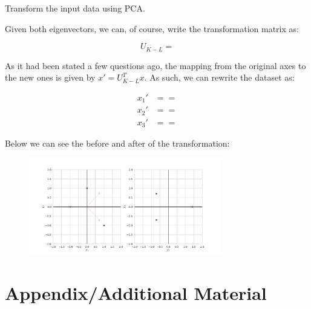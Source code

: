 \documentclass[12pt]{article}
\begin{document}
\begin{enumerate}[leftmargin=\labelsep]
\begin{tcolorbox}[enhanced jigsaw,halign=center,colback=bg,boxrule=0pt,arc=1pt]
    Transform the input data using PCA.

  \end{tcolorbox}

  Given both eigenvectors, we can, of course, write the transformation matrix
  as:

  \begin{equation*}
    U_{K-L} = 
  \end{equation*}

  As it had been stated a few questions ago, the mapping from the original
  axes to the new ones is given by $x' = U_{K-L}^T x$. As such, we can
  rewrite the dataset as:

  \begin{equation*}
    \begin{aligned}
      x_1' & =   =  \\
      x_2' & =   =  \\
      x_3' & =   = 
    \end{aligned}
  \end{equation*}

  Below we can see the before and after of the transformation:

  \begin{figure}[h]
    \centering
    \includegraphics[width=0.75\textwidth]{assets/ex-5/samples.png}
    \label{fig:samples-5}
  \end{figure}


\end{enumerate}

\pagebreak

\section*{Appendix/Additional Material}
\end{document}
